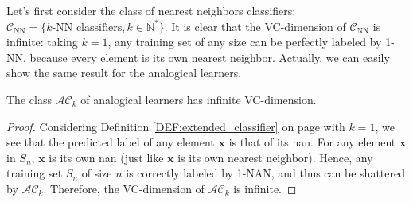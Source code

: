
Let's first consider the class of nearest neighbors classifiers:
$\mathcal{C}_{\text{NN}}=\{ k\text{-NN classifiers}, k \in \mathbb{N}^*\}$. It
is clear that the VC-dimension of $\mathcal{C}_{\text{NN}}$ is infinite: taking
$k = 1$, any training set of any size can be perfectly labeled by 1-NN,
because every element is its own nearest neighbor. Actually, we can easily show
the same result for the analogical learners.

\begin{proposition}
  \label{PROPOS:VCdim}
  The class $\mathcal{AC}_k$ of analogical learners has infinite VC-dimension.
\end{proposition}
\begin{proof}
  Considering Definition \ref{DEF:extended_classifier} on page
  \pageref{DEF:extended_classifier} with $k = 1$, we see
  that the predicted label of any element $\mathbf{x}$ is that of its nan. For
  any element $\mathbf{x}$ in $S_n$, $\mathbf{x}$ is its own nan (just like
  $\mathbf{x}$ is its own nearest neighbor). Hence, any training set $S_n$ of
  size $n$ is correctly labeled by 1-NAN, and thus can be shattered by
  $\mathcal{AC}_k$. Therefore, the VC-dimension of $\mathcal{AC}_k$ is infinite.
\end{proof}

